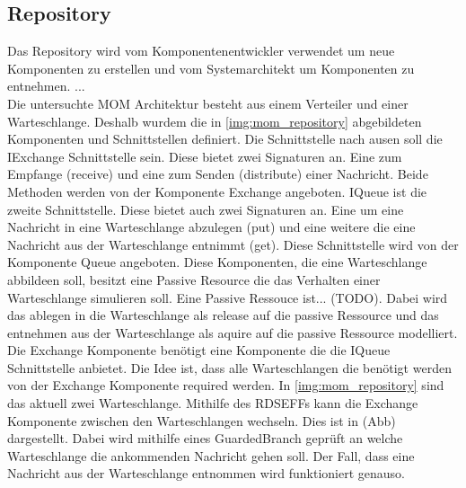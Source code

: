 
\subsection{Repository}
Das Repository wird vom Komponentenentwickler verwendet um neue Komponenten zu erstellen und vom Systemarchitekt um Komponenten zu entnehmen. ... \\
Die untersuchte MOM Architektur besteht aus einem Verteiler und einer Warteschlange. Deshalb wurdem die in \autoref{img:mom_repository} abgebildeten Komponenten und Schnittstellen definiert. Die Schnittstelle nach ausen soll die IExchange Schnittstelle sein. Diese bietet zwei Signaturen an. Eine zum Empfange (receive) und eine zum Senden (distribute) einer Nachricht. Beide Methoden werden von der Komponente Exchange angeboten. IQueue ist die zweite Schnittstelle. Diese bietet auch zwei Signaturen an. Eine um eine Nachricht in eine Warteschlange abzulegen (put) und eine weitere die eine Nachricht aus der Warteschlange entnimmt (get). Diese Schnittstelle wird von der Komponente Queue angeboten. Diese Komponenten, die eine Warteschlange abbildeen soll, besitzt eine Passive Resource die das Verhalten einer Warteschlange simulieren soll. Eine Passive Ressouce ist... (TODO). Dabei wird das ablegen in die Warteschlange als release auf die passive Ressource und das entnehmen aus der Warteschlange als aquire auf die passive Ressource modelliert. Die Exchange Komponente benötigt eine Komponente die die IQueue Schnittstelle anbietet. Die Idee ist, dass alle Warteschlangen die benötigt werden von der Exchange Komponente required werden. In \autoref{img:mom_repository} sind das aktuell zwei Warteschlange. Mithilfe des RDSEFFs kann die Exchange Komponente zwischen den Warteschlangen wechseln. Dies ist in (Abb) dargestellt. Dabei wird mithilfe eines GuardedBranch geprüft an welche Warteschlange die ankommenden Nachricht gehen soll. Der Fall, dass eine Nachricht aus der Warteschlange entnommen wird funktioniert genauso. 


